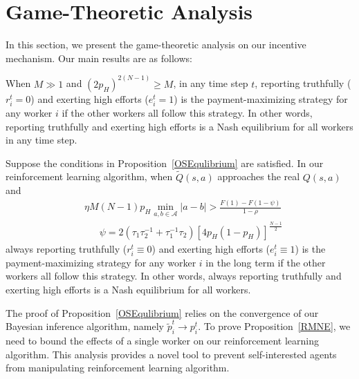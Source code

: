\section{Game-Theoretic Analysis}
In this section, we present the game-theoretic analysis on our incentive mechanism. Our main results are as follows:
\begin{proposition}
\label{OSEqulibrium}
When $M\gg 1$ and $(2p_H)^{2(N-1)} \geq M$, in any time step $t$, reporting truthfully ($r^{t}_i = 0$) and exerting high efforts ($e^{t}_i=1$) is the payment-maximizing strategy for any worker $i$ if the other workers all follow this strategy. In other words, reporting truthfully and exerting high efforts is a Nash equilibrium for all workers in any time step.
\end{proposition}
\begin{proposition}
\label{RMNE}
Suppose the conditions in Proposition~\ref{OSEqulibrium} are satisfied. In our reinforcement learning algorithm, when $\tilde{Q}(s,a)$ approaches the real $Q(s,a)$ and
\begin{equation}
\label{Condition}
\begin{split}
&\eta M(N-1)p_H \min_{a,b\in\mathcal{A}}|a-b|> \frac{F(1)-F(1-\psi)}{1-\rho}\\
&\quad\;\;\psi =2(\tau_1\tau_2^{-1}+\tau_1^{-1}\tau_2)[4p_H(1-p_H)]^{\frac{N-1}{2}}
\end{split}
\end{equation}
always reporting truthfully ($r^{t}_i \equiv 0$) and exerting high efforts ($e^{t}_i\equiv 1$) is the payment-maximizing strategy for any worker $i$ in the long term if the other workers all follow this strategy.
In other words, always reporting truthfully and exerting high efforts is a Nash equilibrium for all workers.
\end{proposition}
The proof of Proposition~\ref{OSEqulibrium} relies on the convergence of our Bayesian inference algorithm, namely $\tilde{p}_i^t\rightarrow p_i^t$.
To prove Proposition~\ref{RMNE}, we need to bound the effects of a single worker on our reinforcement learning algorithm.
This analysis provides a novel tool to prevent self-interested agents from manipulating reinforcement learning algorithm.


